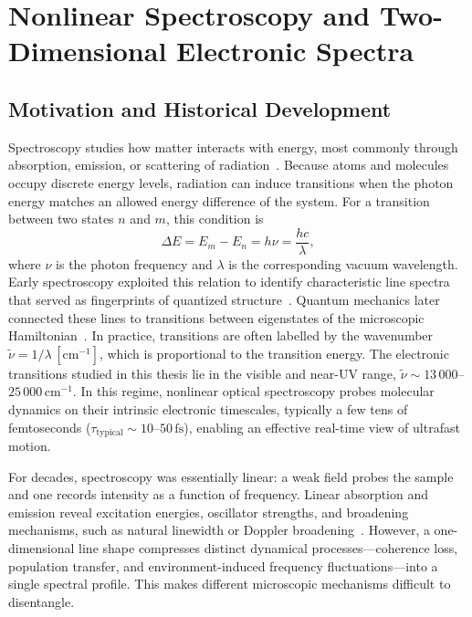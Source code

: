 \chapter{Nonlinear Spectroscopy and Two-Dimensional Electronic Spectra}
\label{chapter:spctr_spectroscopy}


\section{Motivation and Historical Development}
\label{sec:spctr_spectroscopy_motivation}
Spectroscopy studies how matter interacts with energy, most commonly through absorption, emission, or scattering of radiation~\cite{skoogetal2017principlesinstrumentalanalysis}.
Because atoms and molecules occupy discrete energy levels, radiation can induce transitions when the photon energy matches an allowed energy difference of the system. For a transition between two states \(n\) and \(m\), this condition is
\begin{equation*}
	\Delta E = E_m-E_n = h\nu = \frac{hc}{\lambda},
\end{equation*}
where \(\nu\) is the photon frequency and \(\lambda\) is the corresponding vacuum wavelength.
Early spectroscopy exploited this relation to identify characteristic line spectra that served as fingerprints of quantized structure~\cite{balmer1885notizuberspectrallinien, rydberg1890xxxivstructurelinespectra, bohr1913constitutionatomsmolecules}.
Quantum mechanics later connected these lines to transitions between eigenstates of the microscopic Hamiltonian~\cite{berman2011principleslaserspectroscopy, dirac1927quantumtheoryemission}.
In practice, transitions are often labelled by the wavenumber $\tilde{\nu}=1/\lambda\,[\mathrm{cm}^{-1}]$, which is proportional to the transition energy.
The electronic transitions studied in this thesis lie in the visible and near-UV range, $\tilde{\nu}\sim 13\,000$--$25\,000\,\mathrm{cm}^{-1}$. In this regime, nonlinear optical spectroscopy probes molecular dynamics on their intrinsic electronic timescales, typically a few tens of femtoseconds ($\tau_{\mathrm{typical}}\sim 10$--$50\,\mathrm{fs}$), enabling an effective real-time view of ultrafast motion.

For decades, spectroscopy was essentially linear: a weak field probes the sample and one records intensity as a function of frequency.
Linear absorption and emission reveal excitation energies, oscillator strengths, and broadening mechanisms, such as natural linewidth or Doppler broadening~\cite{skoogetal2017principlesinstrumentalanalysis}.
However, a one-dimensional line shape compresses distinct dynamical processes---coherence loss, population transfer, and environment-induced frequency fluctuations---into a single spectral profile.
This makes different microscopic mechanisms difficult to disentangle.


